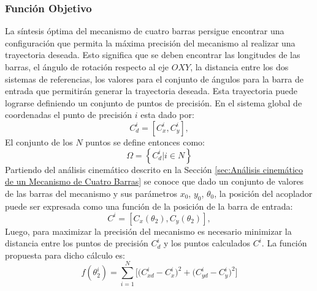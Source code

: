 \subsubsection{Función Objetivo}\label{sec:Funcion Objetivo de MEC}
La síntesis óptima del mecanismo de cuatro barras persigue encontrar una configuración que permita la máxima precisión del mecanismo al realizar una trayectoria deseada. Esto significa que se deben encontrar las longitudes de las barras, el ángulo de rotación respecto al eje $OXY$, la distancia entre los dos sistemas de referencias, los valores para el conjunto de ángulos para la barra de entrada que permitirán generar la trayectoria deseada. Esta trayectoria puede lograrse definiendo un conjunto de puntos de precisión. En el sistema global de coordenadas el punto de precisión $i$ esta dado por:
\begin{equation}
C^i_d=\left[C^i_x,C^i_y \right],
\end{equation}
El conjunto de los $N$ puntos se define entonces como:
\begin{equation}
\Omega=\left \{ C^i_d | i \in N \right \}
\end{equation}
Partiendo del análisis cinemático descrito en la Sección \ref{sec:Análisis cinemático de un Mecanismo de Cuatro Barras} se conoce que dado un conjunto de valores de las barras del mecanismo y sus parámetros $x_0$, $y_0$, $\theta_0$, la posición del acoplador puede ser expresada como una función de la posición de la barra de entrada: 
\begin{equation}
C^i=\left[C_x\left(\theta_2\right),C_y\left(\theta_2 \right) \right],
\end{equation}
Luego, para maximizar la precisión del mecanismo es necesario minimizar la distancia entre los puntos de precisión $C^i_d$ y los puntos calculados $C^i$. La función propuesta para dicho cálculo es:
\begin{equation}
f(\theta^i_2)= \sum_{i=1}^{N} \big[\big(C^{i}_{xd}-C^{i}_{x} \big)^2 +\big(C^{i}_{yd}-C^{i}_{y} \big)^2\big]
\end{equation}
